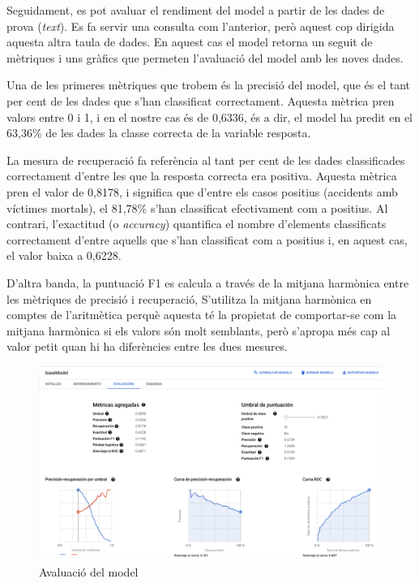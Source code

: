\documentclass[11pt,longbibliography]{article}
\theoremstyle{definition}
\theoremstyle{remark}
\begin{document}
Seguidament, es pot avaluar el rendiment del model a partir de les dades de prova (\emph{text}). Es fa servir una consulta com l'anterior, però aquest cop dirigida aquesta altra taula de dades. En aquest cas el model retorna un seguit de mètriques i uns gràfics que permeten l'avaluació del model amb les noves dades.



Una de les primeres mètriques que trobem és la precisió del model, que és el tant per cent de les dades que s'han classificat correctament. Aquesta mètrica pren valors entre 0 i 1, i en el nostre cas és de 0,6336, és a dir, el model ha predit en el 63,36\% de les dades la classe correcta de la variable resposta. 



La mesura de recuperació fa referència al tant per cent de les dades classificades correctament d'entre les que la resposta correcta era positiva. Aquesta mètrica pren el valor de 0,8178, i significa que d'entre els casos positius (accidents amb víctimes mortals), el 81,78\% s'han classificat efectivament com a positius. Al contrari, l'exactitud (o \emph{accuracy}) quantifica el nombre d'elements classificats correctament d'entre aquells que s'han classificat com a positius i, en aquest cas, el valor baixa a 0,6228.



D'altra banda, la puntuació F1 es calcula a través de la mitjana harmònica entre les mètriques de precisió i recuperació, S'utilitza la mitjana harmònica en comptes de l'aritmètica perquè aquesta té la propietat de comportar-se com la mitjana harmònica si els valors són molt semblants, però s'apropa més cap al valor petit quan hi ha diferències entre les dues mesures.


\begin{figure}[H]
\begin{center}
\includegraphics[width=16cm]{log2}
\end{center}
\caption{Avaluació del model}
\label{fig:log2}
\end{figure}
\end{document}
